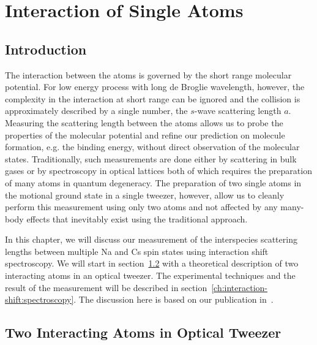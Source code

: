 
\chapter{Interaction of Single Atoms}
\label{ch:interaction-shift}

\section{Introduction}
\label{ch:interaction-shift:introduction}

The interaction between the atoms is governed by the short range molecular potential.
For low energy process with long de Broglie wavelength, however,
the complexity in the interaction at short range
can be ignored and the collision is approximately described by a single number,
the $s$-wave scattering length $a$.
Measuring the scattering length between the atoms allows us to probe the properties
of the molecular potential and refine our prediction on molecule formation,
e.g. the binding energy, without direct observation of the molecular states.
Traditionally, such measurements are done either by scattering in bulk gases
or by spectroscopy in optical lattices both of which requires the preparation
of many atoms in quantum degeneracy.
The preparation of two single atoms in the motional ground state in a single tweezer,
however, allow us to cleanly perform this measurement using only two atoms
and not affected by any many-body effects that inevitably exist using the traditional approach.

In this chapter, we will discuss our measurement of the interspecies scattering lengths
between multiple Na and Cs spin states using interaction shift spectroscopy.
We will start in section~\ref{ch:interaction-shift:theory}
with a theoretical description of two interacting atoms in an optical tweezer.
The experimental techniques and the result of the measurement will be described
in section~\ref{ch:interaction-shift:spectroscopy}.
The discussion here is based on our publication in~\cite{hood_multichannel_2020}.

\section{Two Interacting Atoms in Optical Tweezer}
\label{ch:interaction-shift:theory}

